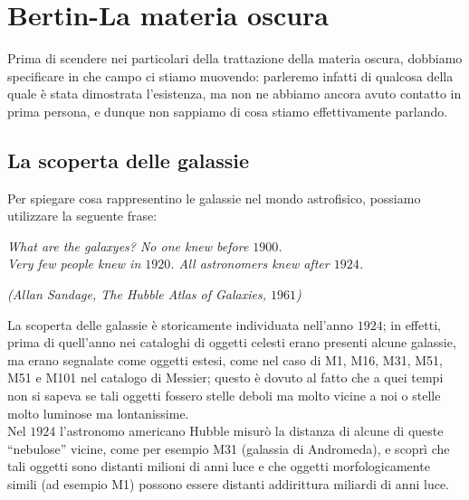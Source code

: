 \chapter[La materia oscura]{Bertin-La materia oscura}

Prima di scendere nei particolari della trattazione della materia oscura, dobbiamo specificare in che campo ci stiamo muovendo: parleremo infatti di qualcosa della quale è stata dimostrata l'esistenza, ma non ne abbiamo ancora avuto contatto in prima persona, e dunque non sappiamo di cosa stiamo effettivamente parlando.

\section{La scoperta delle galassie}

Per spiegare cosa rappresentino le galassie nel mondo astrofisico, possiamo utilizzare la seguente frase:
\begin{center}
\emph{What are the galaxyes? No one knew before $1900$.\\
Very few people knew in $1920$. All astronomers knew after $1924$.\\}
\end{center}
\begin{center}
\textit{(Allan Sandage, The Hubble Atlas of Galaxies, $1961$)\\}
\end{center}
La scoperta delle galassie è storicamente individuata nell'anno $1924$; in effetti, prima di quell'anno nei cataloghi di oggetti celesti erano presenti alcune galassie, ma erano segnalate come oggetti estesi, come nel caso di M1, M16, M31, M51, M51 e M101 nel catalogo di Messier; questo è dovuto al fatto che a quei tempi non si sapeva se tali oggetti fossero stelle deboli ma molto vicine a noi o stelle molto luminose ma lontanissime.\\
Nel $1924$ l'astronomo americano Hubble misurò la distanza di alcune di queste ``nebulose'' vicine, come per esempio M31 (galassia di Andromeda), e scoprì che tali oggetti sono distanti milioni di anni luce e che oggetti morfologicamente simili (ad esempio M1) possono essere distanti addirittura miliardi di anni luce.\\

